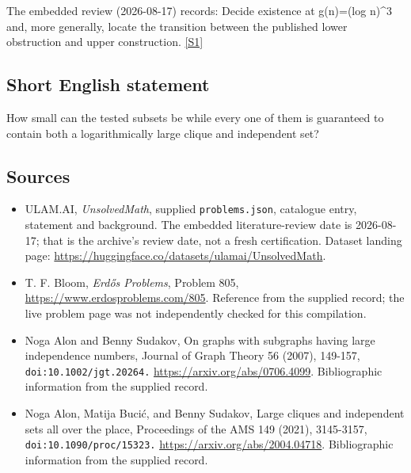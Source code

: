 \documentclass[11pt,a4paper]{article}
\newcommand{\sref}[2]{\hyperlink{source:#1:#2}{[S#2]}}
\begin{document}
The embedded review (2026-08-17) records: Decide existence at g(n)=(log n)\textasciicircum{}3 and, more generally, locate the transition between the published lower obstruction and upper construction. \sref{statement}{1}

\subsection{Short English statement}

How small can the tested subsets be while every one of them is guaranteed to contain both a logarithmically large clique and independent set?

\subsection{Sources}

{\small

\begin{itemize}

\item[\hypertarget{source:statement:1}{S1}] ULAM.AI, \emph{UnsolvedMath}, supplied \texttt{problems.json}, catalogue entry, statement and background. The embedded literature-review date is 2026-08-17; that is the archive’s review date, not a fresh certification. Dataset landing page: \url{https://huggingface.co/datasets/ulamai/UnsolvedMath}.

\item[\hypertarget{source:statement:2}{S2}] T. F. Bloom, \emph{Erdős Problems}, Problem 805, \url{https://www.erdosproblems.com/805}. Reference from the supplied record; the live problem page was not independently checked for this compilation.

\item[\hypertarget{source:statement:3}{S3}] Noga Alon and Benny Sudakov, On graphs with subgraphs having large independence numbers, Journal of Graph Theory 56 (2007), 149-157, \nolinkurl{doi:10.1002/jgt.20264.} \url{https://arxiv.org/abs/0706.4099}. Bibliographic information from the supplied record.

\item[\hypertarget{source:statement:4}{S4}] Noga Alon, Matija Bucić, and Benny Sudakov, Large cliques and independent sets all over the place, Proceedings of the AMS 149 (2021), 3145-3157, \nolinkurl{doi:10.1090/proc/15323.} \url{https://arxiv.org/abs/2004.04718}. Bibliographic information from the supplied record.

\end{itemize}

}

\label{end:statement}
\end{document}
